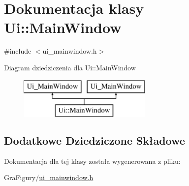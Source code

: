 \hypertarget{classUi_1_1MainWindow}{\section{Dokumentacja klasy Ui\-:\-:Main\-Window}
\label{classUi_1_1MainWindow}
}


{\ttfamily \#include $<$ui\-\_\-mainwindow.\-h$>$}

Diagram dziedziczenia dla Ui\-:\-:Main\-Window\begin{figure}[H]
\begin{center}
\leavevmode
\includegraphics[height=2.000000cm]{classUi_1_1MainWindow}
\end{center}
\end{figure}
\subsection*{Dodatkowe Dziedziczone Składowe}


Dokumentacja dla tej klasy została wygenerowana z pliku\-:\begin{DoxyCompactItemize}
\item 
Gra\-Figury/\hyperlink{GraFigury_2ui__mainwindow_8h}{ui\-\_\-mainwindow.\-h}\end{DoxyCompactItemize}
